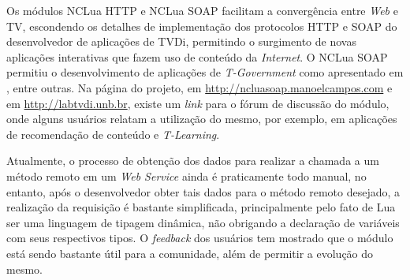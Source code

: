 Os módulos NCLua HTTP e NCLua SOAP facilitam a convergência entre \textit{Web} e TV, escondendo
os detalhes de implementação dos protocolos HTTP e SOAP do desenvolvedor
de aplicações de TVDi, permitindo o surgimento de novas aplicações interativas 
que fazem uso de conteúdo da \textit{Internet}.
O NCLua SOAP permitiu o desenvolvimento de aplicações de \textit{T-Government}
como apresentado em \cite{tgov2010barbosa}, entre outras. Na página do projeto, em \url{http://ncluasoap.manoelcampos.com}
e em \url{http://labtvdi.unb.br},
existe um \textit{link} para o fórum de discussão do módulo, onde alguns usuários relatam a
utilização do mesmo, por exemplo, em aplicações de recomendação de conteúdo e \textit{T-Learning}.

Atualmente, o processo de obtenção dos dados para realizar a chamada a um método remoto em um \textit{Web Service}
ainda é praticamente todo manual, no entanto, 
após o desenvolvedor obter tais dados para o método remoto desejado, a realização da requisição é bastante simplificada,
principalmente pelo fato de Lua ser uma linguagem de tipagem dinâmica, 
não obrigando a declaração de variáveis com seus respectivos tipos.
O \textit{feedback} dos usuários tem mostrado que o módulo está sendo bastante útil para 
a comunidade, além de permitir a evolução do mesmo.
